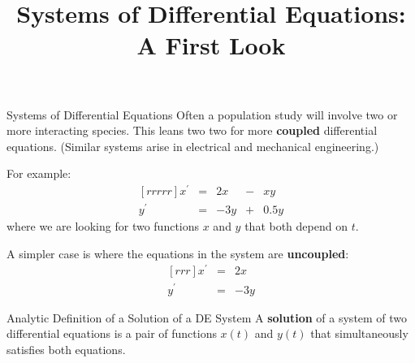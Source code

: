 \documentclass{beamer}
\title[MA245 - Section 2.6]{Systems of Differential Equations: A First Look}
\begin{document}
\begin{frame}
\titlepage
\end{frame}

\begin{frame}
\begin{block}{Systems of Differential Equations}
Often a population study will involve two or more interacting species. This leans two two for more \textbf{coupled} differential equations. (Similar systems arise in electrical and mechanical engineering.)\pause

\vspace{2mm}
For example:
\begin{equation*}
\begin{matrix}[rrrrr]
x^\prime &=& 2x &-& xy \\
y^\prime &=& -3y &+& 0.5y
\end{matrix}
\end{equation*}
where we are looking for two functions $x$ and $y$ that both depend on $t$.\pause

\vspace{2mm}
A simpler case is where the equations in the system are \textbf{uncoupled}:
\begin{equation*}
\begin{matrix}[rrr]
x^\prime &=& 2x \\
y^\prime &=& -3y
\end{matrix}
\end{equation*}
\end{block}\pause

\begin{block}{Analytic Definition of a Solution of a DE System}
A \textbf{solution} of a system of two differential equations is a pair of functions $x(t)$ and $y(t)$ that simultaneously satisfies both equations.
\end{block}
\end{frame}
\end{document}
